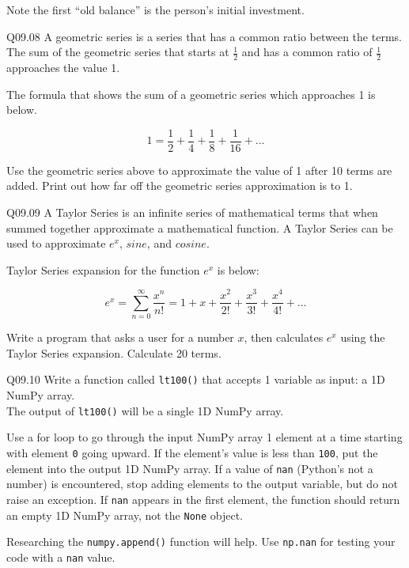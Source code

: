 \documentclass{book}
\newenvironment{problems}{}{}  %
\newcommand{\passthrough}[1]{#1}
\begin{document}
\begin{problems}
Note the first ``old balance'' is the person's initial investment.

Q09.08 A geometric series is a series that has a common ratio between
the terms. The sum of the geometric series that starts at
\(\frac{1}{2}\) and has a common ratio of \(\frac{1}{2}\) approaches the
value 1.

The formula that shows the sum of a geometric series which approaches 1
is below.

\[ 1 = \frac{1}{2} + \frac{1}{4} + \frac{1}{8} + \frac{1}{16} + ... \]

Use the geometric series above to approximate the value of 1 after 10
terms are added. Print out how far off the geometric series
approximation is to 1.

Q09.09 A Taylor Series is an infinite series of mathematical terms that
when summed together approximate a mathematical function. A Taylor
Series can be used to approximate \(e^x\), \(sine\), and \(cosine\).

Taylor Series expansion for the function \(e^x\) is below:

\[  {e^x} = \sum\limits_{n = 0}^\infty  {\frac{{{x^n}}}{{n!}}}  = 1 + x + \frac{{{x^2}}}{{2!}} + \frac{{{x^3}}}{{3!}} + \frac{{{x^4}}}{{4!}} + ... \]

Write a program that asks a user for a number \(x\), then calculates
\(e^x\) using the Taylor Series expansion. Calculate 20 terms.

Q09.10 Write a function called \passthrough{\lstinline!lt100()!} that
accepts 1 variable as input: a 1D NumPy array.\\
The output of \passthrough{\lstinline!lt100()!} will be a single 1D
NumPy array.

Use a for loop to go through the input NumPy array 1 element at a time
starting with element \passthrough{\lstinline!0!} going upward. If the
element's value is less than \passthrough{\lstinline!100!}, put the
element into the output 1D NumPy array. If a value of
\passthrough{\lstinline!nan!} (Python's not a number) is encountered,
stop adding elements to the output variable, but do not raise an
exception. If \passthrough{\lstinline!nan!} appears in the first
element, the function should return an empty 1D NumPy array, not the
\passthrough{\lstinline!None!} object.

Researching the \passthrough{\lstinline!numpy.append()!} function will
help. Use \passthrough{\lstinline!np.nan!} for testing your code with a
\passthrough{\lstinline!nan!} value.


\end{problems}
\end{document}
